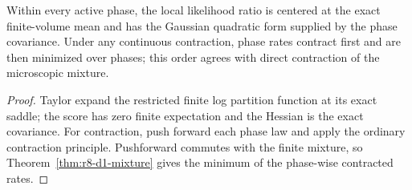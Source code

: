 \begin{theorem}
\label{thm:r8-d1-likelihood}
Within every active phase, the local likelihood ratio is centered at the exact
finite-volume mean and has the Gaussian quadratic form supplied by the phase
covariance.  Under any continuous contraction, phase rates contract first and
are then minimized over phases; this order agrees with direct contraction of
the microscopic mixture.
\end{theorem}

\begin{proof}
Taylor expand the restricted finite log partition function at its exact saddle;
the score has zero finite expectation and the Hessian is the exact covariance.
For contraction, push forward each phase law and apply the ordinary contraction
principle.  Pushforward commutes with the finite mixture, so
Theorem~\ref{thm:r8-d1-mixture} gives the minimum of the phase-wise contracted
rates.
\end{proof}
